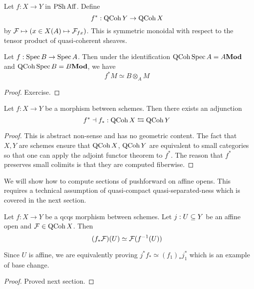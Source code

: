 \documentclass[./main.tex]{subfiles}
\begin{document}
\begin{dfn}
  
  Let $f : X \to Y$ in $\operatorname{PSh} \mathrm{Aff}$.
  Define \[
    f^* : \operatorname{QCoh} Y \to \operatorname{QCoh} X  
  \]
  by $\mathcal{F} \mapsto (x \in X(A) \mapsto \mathcal{F}_{fx})$.
  This is symmetric monoidal with respect to the tensor product of
  quasi-coherent sheaves.
\end{dfn}

\begin{prop}
  
  Let $f : \operatorname{Spec} B \to \operatorname{Spec} A$.
  Then under the identification $\operatorname{QCoh} \operatorname{Spec} A = A\mathbf{Mod}$
  and $\operatorname{QCoh} \operatorname{Spec} B = B\mathbf{Mod}$,
  we have 
  \[
    f^* M \simeq B \otimes_A M  
  \]
\end{prop}
\begin{proof}
  Exercise.
\end{proof}

\begin{prop}
  
  Let $f : X \to Y$ be a morphism between schemes.
  Then there exists an adjunction
  \[
    f^* \dashv f_* : \operatorname{QCoh} X \leftrightarrows \operatorname{QCoh} Y  
  \]
\end{prop}
\begin{proof}
  This is abstract non-sense and has no geometric content.
  The fact that $X , Y$ are schemes ensure that
  $\operatorname{QCoh} X$, $\operatorname{QCoh} Y$ are equivalent to small categories 
  so that one can apply the adjoint functor theorem to $f^*$.
  The reason that $f^*$ preserves small colimits is that
  they are computed fiberwise.
\end{proof}

We will show how to compute sections of pushforward on affine opens.
This requires a technical assumption of quasi-compact quasi-separated-ness
which is covered in the next section.
\begin{prop}
  
  Let $f : X \to Y$ be a qcqs morphism between schemes.
  Let $j : U \subseteq Y$ be an affine open and $\mathcal{F} \in \operatorname{QCoh} X$.
  Then \[
    (f_* \mathcal{F})(U) \simeq \mathcal{F}(f^{-1}(U))  
  \]
\end{prop}
Since $U$ is affine,
we are equivalently proving $j^* f_* \simeq (f_1)_* j_1^*$
which is an example of base change.
\begin{proof}
  Proved next section.
\end{proof}
\end{document}
